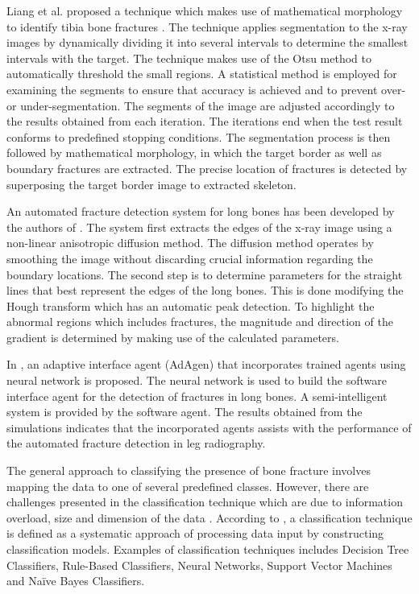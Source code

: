 \documentclass[11pt,twocolumn]{witseiepaper}
\begin{document}
	Liang et al. proposed a technique which makes use of mathematical morphology to identify tibia bone fractures \cite{Liang_Pan_Huang_Fan_2010}. The technique applies segmentation to the x-ray images by dynamically dividing it into several intervals to determine the smallest intervals with the target. The technique makes use of the Otsu method to automatically threshold the small regions. A statistical method is employed for examining the segments to ensure that accuracy is achieved and to prevent over- or under-segmentation. The segments of the image are adjusted accordingly to the results obtained from each iteration. The iterations end when the test result conforms to predefined stopping conditions. The segmentation process is then followed by mathematical morphology, in which the target border as well as boundary fractures are extracted. The precise location of fractures is detected by superposing the target border image to extracted skeleton.
	
	An automated fracture detection system for long bones has been developed by the authors of \cite{Donnelley2005}. The system first extracts the edges of the x-ray image using a non-linear anisotropic diffusion method. The diffusion method operates by smoothing the image without discarding crucial information regarding the boundary locations. The second step is to determine parameters for the straight lines that best represent the edges of the long bones. This is done modifying the Hough transform which has an automatic peak detection. To highlight the abnormal regions which includes fractures, the magnitude and direction of the gradient is determined by making use of the calculated parameters.
	
	In \cite{Syiam_Aziem_Soliman2004}, an adaptive interface agent (AdAgen) that incorporates trained agents using neural network is proposed. The neural network is used to build the software interface agent for the detection of fractures in long bones. A semi-intelligent system is provided by the software agent. The results obtained from the simulations indicates that the incorporated agents assists with the performance of the automated fracture detection in leg radiography.
	
	The general approach to classifying the presence of bone fracture involves mapping the data to one of several predefined classes. However, there are challenges presented 
	in the classification technique which are due to information overload, size and dimension of the data \cite{Mahendran2011}. According to \cite{Mahendran2011}, a classification technique is defined as a systematic approach of processing data input by constructing classification models. Examples of classification techniques includes Decision Tree Classifiers, Rule-Based Classifiers, Neural Networks, Support Vector Machines and Na\"{i}ve Bayes Classifiers.
	
\end{document}
